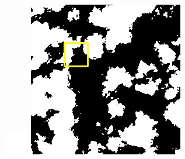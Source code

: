 \documentclass[UTF8]{ctexart}
\begin{document}
\begin{figure}[H]
{\begin{minipage}[b]{0.15\linewidth}
            \includegraphics[width=1\linewidth]{../log/spoon2/cut/tmp_cut_LC81321192014054LGN00_03055_mask.jpg}\vspace{4pt}
            \includegraphics[width=1\linewidth]{../log/spoon2/cut/LC80350192014190LGN00_06561_mask.jpg}\vspace{4pt}

\end{minipage}}
\end{figure}
\end{document}
